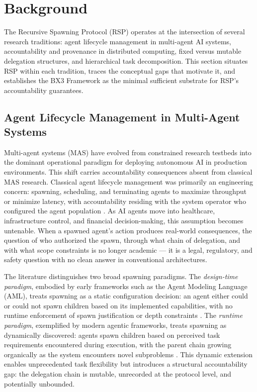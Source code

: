 \section{Background}
\label{sec:rs-background}

The Recursive Spawning Protocol (RSP) operates at the intersection of several research traditions: agent lifecycle management in multi-agent AI systems, accountability and provenance in distributed computing, fixed versus mutable delegation structures, and hierarchical task decomposition. This section situates RSP within each tradition, traces the conceptual gaps that motivate it, and establishes the BX3 Framework as the minimal sufficient substrate for RSP's accountability guarantees.

\subsection{Agent Lifecycle Management in Multi-Agent Systems}

Multi-agent systems (MAS) have evolved from constrained research testbeds into the dominant operational paradigm for deploying autonomous AI in production environments. This shift carries accountability consequences absent from classical MAS research. Classical agent lifecycle management was primarily an engineering concern: spawning, scheduling, and terminating agents to maximize throughput or minimize latency, with accountability residing with the system operator who configured the agent population \cite{bansal2019}. As AI agents move into healthcare, infrastructure control, and financial decision-making, this assumption becomes untenable. When a spawned agent's action produces real-world consequences, the question of who authorized the spawn, through what chain of delegation, and with what scope constraints is no longer academic --- it is a legal, regulatory, and safety question with no clean answer in conventional architectures.

The literature distinguishes two broad spawning paradigms. The \emph{design-time paradigm}, embodied by early frameworks such as the Agent Modeling Language (AML), treats spawning as a static configuration decision: an agent either could or could not spawn children based on its implemented capabilities, with no runtime enforcement of spawn justification or depth constraints \cite{bansal2019}. The \emph{runtime paradigm}, exemplified by modern agentic frameworks, treats spawning as dynamically discovered: agents spawn children based on perceived task requirements encountered during execution, with the parent chain growing organically as the system encounters novel subproblems \cite{autoGPT2023, langchain2023}. This dynamic extension enables unprecedented task flexibility but introduces a structural accountability gap: the delegation chain is mutable, unrecorded at the protocol level, and potentially unbounded.

